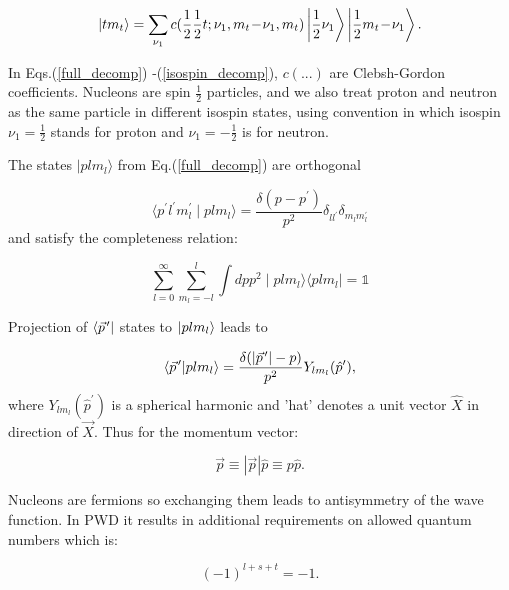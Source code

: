    \begin{equation}
        \ket{t m_t} = \sum_{\nu_1} c(\frac{1}{2}\frac{1}{2}t;\nu_1, m_t\!-\!\nu_1, m_t)
        \ket{\frac{1}{2} \nu_1}
        \ket{\frac{1}{2} m_t\!-\!\nu_1}.
        \label{isospin_decomp}
    \end{equation}

    In Eqs.(\ref{full_decomp}) -(\ref{isospin_decomp}),  $c(...)$ are Clebsh-Gordon coefficients.
    Nucleons are spin $\frac{1}{2}$ particles, and we also treat proton and neutron as 
    the same particle in different 
    isospin states, using convention in which isospin $\nu_1 = \frac{1}{2}$ stands for proton and $\nu_1 = -\frac{1}{2}$ is for neutron.

    The states $\mid p l m_l \rangle$ from Eq.(\ref{full_decomp}) are orthogonal
    
    \begin{equation}
        \langle p^\prime l^\prime m_l^\prime \mid p l m_l \rangle = 
        \frac{\delta(p - p^\prime)}{p^2} \delta_{ll^\prime}\delta_{m_l m_l^\prime}
    \end{equation}
    and satisfy the completeness relation:

    \begin{equation}
        \sum_{l=0}^\infty \sum_{m_l=-l}^l \int dp p^2 \mid plm_l \rangle \langle plm_l \mid = \mathbb{1}
    \end{equation}


    Projection of $\bra{\pvec{p}}$ states to $\ket{plm_l}$ leads to

    \begin{equation}
        \braket{\pvec{p}}{plm_l} = 
        \frac{\delta ( \abs{\pvec{p}} - p)}{p^2} Y _{l m_l}(\hat{p}^\prime),
    \end{equation}
    where $Y _{l m_l}(\hat{p}^\prime)$ is a spherical harmonic and 'hat' denotes a unit vector $\hat{X}$ in 
    direction of $\vec{X}$. Thus for the momentum vector:

    \begin{equation}
        \vec{p} \equiv |\vec{p}| \hat{p} \equiv p \hat{p}. 
        \label{hat}
    \end{equation}

    Nucleons are fermions so exchanging them leads to antisymmetry of the
    wave function. In PWD it results in additional requirements on allowed quantum numbers which
    is:

    \begin{equation}
        (-1)^{l+s+t} = -1.
        \label{parity}
    \end{equation}

